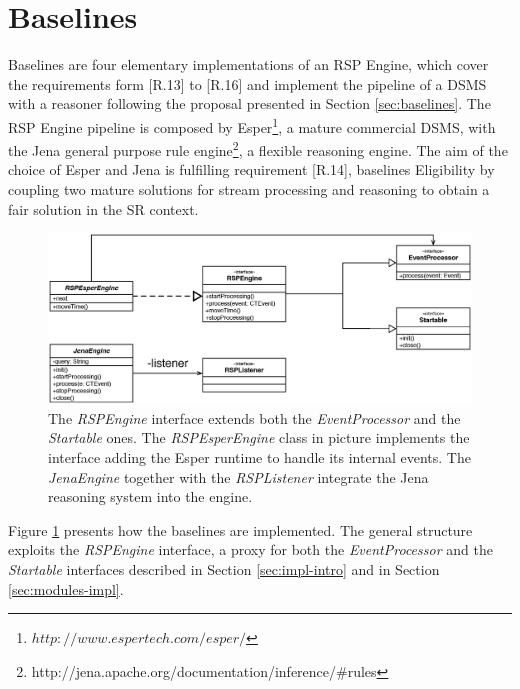 \section{Baselines}\label{sec:baselines-impl}

\name Baselines are four elementary implementations of an RSP Engine, which  cover the requirements form [R.13] to [R.16] and implement the pipeline of a DSMS with a reasoner following the proposal presented in Section \ref{sec:baselines}. 
The RSP Engine pipeline is composed by Esper\footnote{$http://www.espertech.com/esper/$}, a mature commercial DSMS, with the Jena general purpose rule engine\footnote{http://jena.apache.org/documentation/inference/\#rules}, a flexible reasoning engine.  The aim of the choice of Esper and Jena is fulfilling requirement [R.14], baselines Eligibility by coupling two mature solutions for stream processing and reasoning to obtain a fair solution in the SR context.

\begin{figure}[tbh]
  \centering
	\includegraphics[width=\linewidth]{images/uml_baselines_general}
	\caption[\textit{RSPEngine} Implementation Trough Esper and Jena - UML Schema]{The \textit{RSPEngine} interface extends both the \textit{EventProcessor} and the \textit{Startable} ones. The \textit{RSPEsperEngine} class in picture implements the interface adding the Esper runtime to handle its internal events. The \textit{JenaEngine} together with the \textit{RSPListener} integrate the Jena reasoning system into the engine.}
  	\label{fig:uml_baselines_general}
\end{figure}

\noindent Figure \ref{fig:uml_baselines_general} presents how the baselines are implemented. The general structure exploits the \textit{RSPEngine} interface, a proxy for both the \textit{EventProcessor} and the \textit{Startable} interfaces described in Section \ref{sec:impl-intro} and in Section \ref{sec:modules-impl}. 

